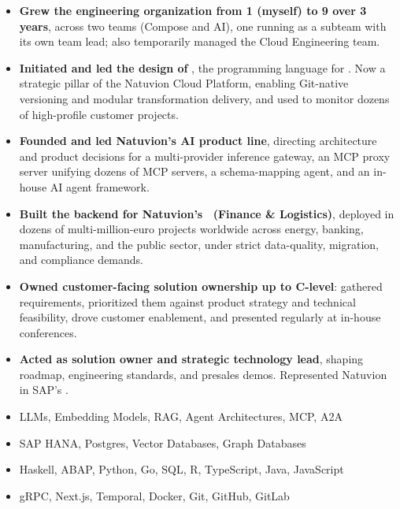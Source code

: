 \documentclass[noindent]{scrartcl}
\begin{document}
\vspace{0.5em}

\begin{itemize}[label=\isym]
    \item {}\textbf{Grew the engineering organization from 1 (myself) to 9 over 3 years}, across two teams (Compose and AI), one running as a subteam with its own team lead; also temporarily managed the Cloud Engineering team.
    \item {}\textbf{Initiated and led the design of \compose}, the programming language for \migrate.
          Now a strategic pillar of the Natuvion Cloud Platform, enabling Git-native versioning and modular transformation delivery, and used to monitor dozens of high-profile customer projects.
    \item {}\textbf{Founded and led Natuvion’s AI product line},
          directing architecture and product decisions for a multi-provider inference gateway, an MCP proxy server unifying dozens of MCP servers, a schema-mapping agent, and an in-house AI agent framework.
    \item {}\textbf{Built the backend for Natuvion’s \transformation\ (Finance \& Logistics)}, deployed in dozens of
          multi-million-euro projects worldwide across energy, banking, manufacturing, and the public sector, under strict data-quality, migration, and compliance demands.
    \item {}\textbf{Owned customer-facing solution ownership up to C-level}: gathered requirements, prioritized them
          against product strategy and technical feasibility, drove customer enablement, and presented regularly at in-house conferences.
    \item {}\textbf{Acted as solution owner and strategic technology lead}, shaping roadmap, engineering standards, and presales demos.
          Represented Natuvion in SAP’s \sdte.
\end{itemize}

\vspace{0.5em}

\begin{itemize}[label=\isym]
    \item {}LLMs, Embedding Models, RAG, Agent Architectures, MCP, A2A
    \item {}SAP HANA, Postgres, Vector Databases, Graph Databases
    \item {}Haskell, ABAP, Python, Go, SQL, R, TypeScript, Java, JavaScript
    \item {}gRPC, Next.js, Temporal, Docker, Git, GitHub, GitLab
\end{itemize}
\end{document}
